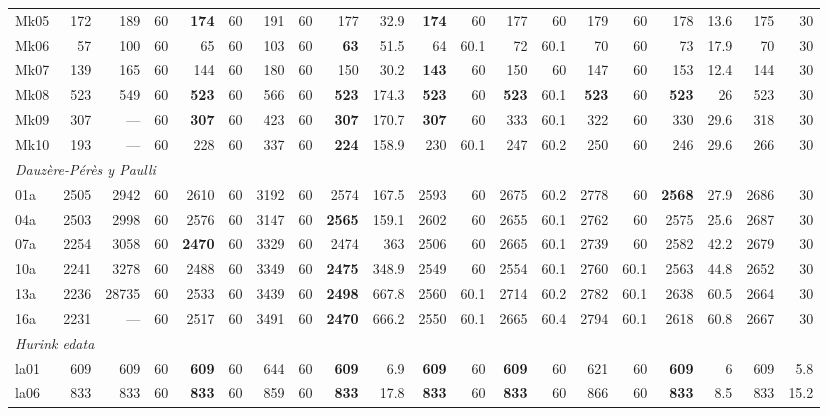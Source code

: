 \documentclass[conference]{IEEEtran}
\begin{document}
\begin{thebibliography}{25}
\begin{table}[tp]
\begin{tabular}{lr rr rr rr rr rr rr rr rr rr}
Mk05 & 172 & 189 & 60 & \textbf{174} & 60 & 191 & 60 & 177 & 32.9 & \textbf{174} & 60 & 177 & 60 & 179 & 60 & 178 & 13.6 & 175 & 30 \\
Mk06 & 57 & 100 & 60 & 65 & 60 & 103 & 60 & \textbf{63} & 51.5 & 64 & 60.1 & 72 & 60.1 & 70 & 60 & 73 & 17.9 & 70 & 30 \\
Mk07 & 139 & 165 & 60 & 144 & 60 & 180 & 60 & 150 & 30.2 & \textbf{143} & 60 & 150 & 60 & 147 & 60 & 153 & 12.4 & 144 & 30 \\
Mk08 & 523 & 549 & 60 & \textbf{523} & 60 & 566 & 60 & \textbf{523} & 174.3 & \textbf{523} & 60 & \textbf{523} & 60.1 & \textbf{523} & 60 & \textbf{523} & 26 & 523 & 30 \\
Mk09 & 307 & --- & 60 & \textbf{307} & 60 & 423 & 60 & \textbf{307} & 170.7 & \textbf{307} & 60 & 333 & 60.1 & 322 & 60 & 330 & 29.6 & 318 & 30 \\
Mk10 & 193 & --- & 60 & 228 & 60 & 337 & 60 & \textbf{224} & 158.9 & 230 & 60.1 & 247 & 60.2 & 250 & 60 & 246 & 29.6 & 266 & 30 \\
\hline
\multicolumn{20}{l}{\emph{Dauz\`ere-P\'er\`es y Paulli}} \\
01a & 2505 & 2942 & 60 & 2610 & 60 & 3192 & 60 & 2574 & 167.5 & 2593 & 60 & 2675 & 60.2 & 2778 & 60 & \textbf{2568} & 27.9 & 2686 & 30 \\
04a & 2503 & 2998 & 60 & 2576 & 60 & 3147 & 60 & \textbf{2565} & 159.1 & 2602 & 60 & 2655 & 60.1 & 2762 & 60 & 2575 & 25.6 & 2687 & 30 \\
07a & 2254 & 3058 & 60 & \textbf{2470} & 60 & 3329 & 60 & 2474 & 363 & 2506 & 60 & 2665 & 60.1 & 2739 & 60 & 2582 & 42.2 & 2679 & 30 \\
10a & 2241 & 3278 & 60 & 2488 & 60 & 3349 & 60 & \textbf{2475} & 348.9 & 2549 & 60 & 2554 & 60.1 & 2760 & 60.1 & 2563 & 44.8 & 2652 & 30 \\
13a & 2236 & 28735 & 60 & 2533 & 60 & 3439 & 60 & \textbf{2498} & 667.8 & 2560 & 60.1 & 2714 & 60.2 & 2782 & 60.1 & 2638 & 60.5 & 2664 & 30 \\
16a & 2231 & --- & 60 & 2517 & 60 & 3491 & 60 & \textbf{2470} & 666.2 & 2550 & 60.1 & 2665 & 60.4 & 2794 & 60.1 & 2618 & 60.8 & 2667 & 30 \\
\hline
\multicolumn{20}{l}{\emph{Hurink \emph{edata}}} \\
la01 & 609 & 609 & 60 & \textbf{609} & 60 & 644 & 60 & \textbf{609} & 6.9 & \textbf{609} & 60 & \textbf{609} & 60 & 621 & 60 & \textbf{609} & 6 & 609 & 5.8 \\
la06 & 833 & 833 & 60 & \textbf{833} & 60 & 859 & 60 & \textbf{833} & 17.8 & \textbf{833} & 60 & \textbf{833} & 60 & 866 & 60 & \textbf{833} & 8.5 & 833 & 15.2 \\

\end{tabular}
\end{table}
\end{thebibliography}
\end{document}
